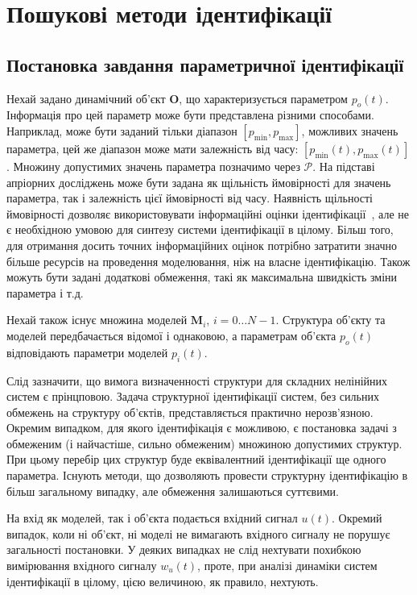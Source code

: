 \chapter{Пошукові методи ідентифікації}

\section{Постановка завдання параметричної ідентифікації} %

Нехай задано динамічний об'єкт
$\mathbf{O}$, що характеризується параметром
$p_o(t)$\label{atu:d:p_o}. Інформація про цей параметр може бути представлена
різними способами. Наприклад, може бути заданий тільки
діапазон
$ [p_{\min}, p_{\max}] $, можливих значень параметра, цей же діапазон може
мати залежність від часу:
$ [p_{\min} (t), p_{\max} (t)] $.
Множину допустимих
значень параметра позначимо через
$ \mathcal{P} $. На підставі апріорних досліджень може бути задана
як щільність ймовірності для значень параметра, так і
залежність цієї ймовірності від часу. Наявність щільності
ймовірності дозволяє використовувати інформаційні оцінки
ідентифікації~\cite{info_cipkin, atu_asau10}, але не є необхідною умовою
для синтезу системи ідентифікації в цілому. Більш того,
для отримання досить точних інформаційних оцінок потрібно
затратити значно більше ресурсів на проведення моделювання,
ніж на власне ідентифікацію. Також можуть бути задані додаткові
обмеження, такі як максимальна швидкість зміни параметра і т.д.

Нехай також існує множина моделей \label{atu:d:N}$\mathbf{M}_i$,
$ i = 0 \ldots N-1 $. Структура об'єкту та моделей передбачається відомої і
однаковою, а параметрам об'єкта
$p_o(t) $ відповідають параметри моделей
$p_{i}(t)$.

Слід зазначити, що вимога визначенності структури для складних
нелінійних систем є прінцповою. Задача структурної
ідентифікації систем, без сильних обмежень на структуру
об'єктів, представляється практично нерозв'язною. Окремим
випадком, для якого ідентифікація є можливою, є постановка
задачі з обмеженим (і найчастіше, сильно обмеженим) множиною
допустимих структур. При цьому перебір цих структур буде
еквівалентний ідентифікації ще одного параметра. Існують
методи, що дозволяють провести структурну ідентифікацію в
більш загальному випадку, але обмеження залишаються суттєвими.



На вхід як моделей, так і об'єкта подається вхідний сигнал
\label{atu:d:u}$u(t)$.
Окремий випадок, коли ні об'єкт, ні моделі не вимагають
вхідного сигналу не порушує загальності постановки. У деяких
випадках не слід нехтувати похибкою вимірювання вхідного
сигналу $ w_u (t) $, проте, при аналізі динаміки систем ідентифікації в
цілому, цією величиною, як правило, нехтують.

